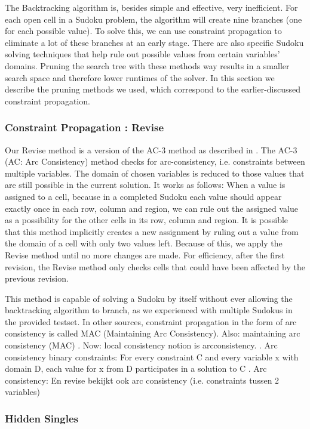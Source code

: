 \documentclass[11pt]{article} %
\begin{document}
The Backtracking algorithm is, besides simple and effective, very inefficient. For each open cell in a Sudoku problem, the algorithm will create nine branches (one for each possible value). To solve this, we can use constraint propagation to eliminate a lot of these branches at an early stage. There are also specific Sudoku solving techniques that help rule out possible values from certain variables' domains. Pruning the search tree with these methods way results in a smaller search space and therefore lower runtimes of the solver. In this section we describe the pruning methods we used, which correspond to the earlier-discussed constraint propagation.

\subsubsection{Constraint Propagation : Revise}

Our Revise method is a version of the AC-3 method as described in \citet{BartakConsistency}. The AC-3 (AC: Arc Consistency) method checks for arc-consistency, i.e. constraints between multiple variables. The domain of chosen variables is reduced to those values that are still possible in the current solution.
It works as follows: When a value is assigned to a cell, because in a completed Sudoku each value should appear exactly once in each row, column and region, we can rule out the assigned value as a possibility for the other cells in its row, column and region. It is possible that this method implicitly creates a new assignment by ruling out a value from the domain of a cell with only two values left. Because of this, we apply the Revise method until no more changes are made. For efficiency, after the first revision, the Revise method only checks cells that could have been affected by the previous revision.

This method is capable of solving a Sudoku by itself without ever allowing the backtracking algorithm to branch, as we experienced with multiple Sudokus in the provided testset.
In other sources, constraint propagation in the form of arc consistency is called MAC (Maintaining Arc Consistency).
Also:
maintaining arc consistency (MAC)
. Now: local consistency notion is arcconsistency.
. Arc consistency binary constraints:
For every constraint C and every variable x with domain D, each
value for x from D participates in a solution to C
. Arc consistency:
En revise bekijkt ook arc consistency (i.e. constraints tussen 2 variables)

\subsubsection{Hidden Singles}
\end{document}
